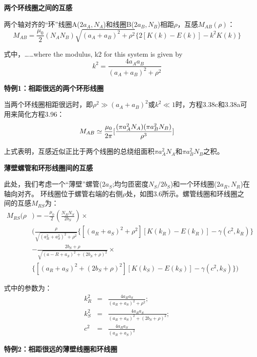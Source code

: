 \textbf{两个环线圈之间的互感} 

两个轴对齐的“环”线圈A($2a_A,N_A$)和线圈B($2a_B,N_B$)相距$\rho$，互感$M_{AB}(\rho)$：
  \begin{equation}
M_{AB}=\frac{\mu_0}{2}(N_AN_B)\sqrt{(a_A+a_B)^2+\rho^2}\{2[K(k)-E(k)]-k^2K(k)\}%
\end{equation}

式中，……where the modulus, k2 for this system is given by
  \begin{equation}
k^2=\frac{4a_Aa_B}{(a_A+a_B)^2+\rho^2}%
\end{equation}

\textbf{特例1：相距很远的两个环形线圈} 

  当两个环线圈相距很远时，即$\rho^2\gg(a_A+a_B)^2$或$k^2\ll 1$时，方程3.38c和3.38a可用来简化方程3.96：
 \begin{equation}
M_{AB}\simeq\frac{\mu_0}{2\pi}[\frac{(\pi a_A^2N_A)(\pi a_B^2N_B)}{\rho^3}]\\%
\end{equation}

上式表明，互感近似正比于两个线圈的总绕组面积$\pi a_A^2 N_A$和$\pi a_B^2 N_B$之积。

\textbf{薄壁螺管和环形线圈间的互感} 

  此处，我们考虑一个“薄壁”螺管($2a_S$;均匀匝密度$N_S/2b_S$)和一个环线圈($2a_R,N_R$)在轴向对齐。
  环线圈位于螺管右端的右侧$\rho$处，如图3.6所示。螺管线圈和环线圈之间的互感$M_{RS}$为：
  \begin{equation}
  \begin{split}
M_{RS}(\rho&)=-\frac{\mu_0}{2}(\frac{N_RN_S}{2b_S})\times\\
&(\frac{\rho}{\sqrt{(a_R^2+a_S^2)^2+\rho^2}}\{[(a_R+a_S)^2+\rho^2][K(k_R)-E(k_R)]-\gamma(c^2,k_R)\}\\
&-\frac{2b_S+\rho}{\sqrt{(a-R+a_S)^2+(2b_S+\rho)^2}}\times\\
&\{[(a_R+a_S)^2+(2b_S+\rho)^2][K(k_S)-E(k_S)]-\gamma(c^2,k_S)\})%
  \end{split}
\end{equation}

式中的参数为：
\begin{eqnarray}
k_R^2&=&\frac{4a_Ra_S}{(a_R+a_S)^2+\rho^2};\\
k_S^2&=&\frac{4a_Ra_S}{(a_R+a_S)^2+(2b_S+\rho)^2};\\
c^2&=&\frac{4a_Ra_S}{(a_R+a_S)^2}%
\end{eqnarray}

\textbf{特例2：相距很远的薄壁线圈和环线圈} 

